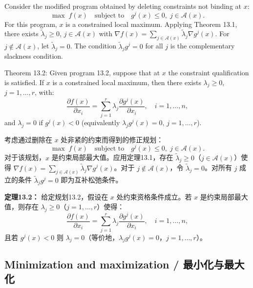 \begin{original}
Consider the modified program obtained by deleting constraints not binding at $x$:
\[
\max \; f(x) \quad \text{subject to} \quad g^j(x) \le 0,\; j \in \mathcal{A}(x). \tag{13.7}
\]
For this program, $x$ is a constrained local maximum. Applying Theorem 13.1, there exists $\tilde{\lambda}_j \ge 0$, $j \in \mathcal{A}(x)$ with $\nabla f(x) = \sum_{j \in \mathcal{A}(x)} \tilde{\lambda}_j \nabla g^j(x)$. For $j \notin \mathcal{A}(x)$, let $\tilde{\lambda}_j = 0$. The condition $\tilde{\lambda}_j g^j = 0$ for all $j$ is the complementary slackness condition.

Theorem 13.2: Given program 13.2, suppose that at $x$ the constraint qualification is satisfied. If $x$ is a constrained local maximum, then there exists $\lambda_j \ge 0$, $j = 1,\dots, r$, with:
\[
\frac{\partial f(x)}{\partial x_i} = \sum_{j=1}^r \lambda_j \frac{\partial g^j(x)}{\partial x_i}, \quad i = 1,\dots, n, \tag{13.8}
\]
and $\lambda_j = 0$ if $g^j(x) < 0$ (equivalently $\lambda_j g^j(x) = 0$, $j = 1,\dots, r$).
\end{original}
\begin{translation}
考虑通过删除在 $x$ 处非紧的约束而得到的修正规划：
\[
\max \; f(x) \quad \text{subject to} \quad g^j(x) \le 0,\; j \in \mathcal{A}(x). \tag{13.7}
\]
对于该规划，$x$ 是约束局部最大值。应用定理13.1，存在 $\tilde{\lambda}_j \ge 0$（$j \in \mathcal{A}(x)$）使得 $\nabla f(x) = \sum_{j \in \mathcal{A}(x)} \tilde{\lambda}_j \nabla g^j(x)$。对于 $j \notin \mathcal{A}(x)$，令 $\tilde{\lambda}_j = 0$。对所有 $j$ 成立的条件 $\tilde{\lambda}_j g^j = 0$ 即为互补松弛条件。

\textbf{定理13.2：} 给定规划13.2，假设在 $x$ 处约束资格条件成立。若 $x$ 是约束局部最大值，则存在 $\lambda_j \ge 0$（$j = 1,\dots, r$）使得：
\[
\frac{\partial f(x)}{\partial x_i} = \sum_{j=1}^r \lambda_j \frac{\partial g^j(x)}{\partial x_i}, \quad i = 1,\dots, n, \tag{13.8}
\]
且若 $g^j(x) < 0$ 则 $\lambda_j = 0$（等价地，$\lambda_j g^j(x) = 0$，$j = 1,\dots, r$）。
\end{translation}

\subsection{Minimization and maximization / 最小化与最大化}


